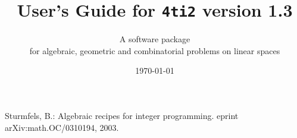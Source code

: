 \documentclass[12pt]{book}
\newcommand{\1}{{\bf 1}}
\newcommand{\FourTiTwo}{{\tt 4ti2}}
\begin{document}
\thispagestyle{empty}

\title{User's Guide for \FourTiTwo{} version 1.3}

\author{A software package\\ for algebraic,
geometric and combinatorial problems on linear spaces}
\date{\today}

\maketitle

\newpage
\thispagestyle{empty}


\tableofcontents








\begin{thebibliography}{99}
Sturmfels, B.: Algebraic recipes for integer programming. eprint
arXiv:math.OC/0310194, 2003.
\end{thebibliography}
\end{document}
